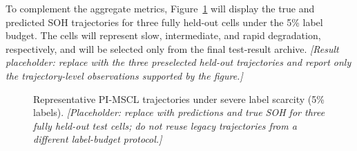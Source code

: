 To complement the aggregate metrics, Figure~\ref{fig:severe_scarcity_trajectories} will display the true and predicted SOH trajectories for three fully held-out cells under the 5\% label budget. The cells will represent slow, intermediate, and rapid degradation, respectively, and will be selected only from the final test-result archive. \textit{[Result placeholder: replace with the three preselected held-out trajectories and report only the trajectory-level observations supported by the figure.]}

\begin{figure}[t]
\centering
\begin{minipage}[t]{0.31\linewidth}
\centering
{}
\end{minipage}\hfill
\begin{minipage}[t]{0.31\linewidth}
\centering
{}
\end{minipage}\hfill
\begin{minipage}[t]{0.31\linewidth}
\centering
{}
\end{minipage}
\caption{Representative PI-MSCL trajectories under severe label scarcity (5\% labels). \textit{[Placeholder: replace with predictions and true SOH for three fully held-out test cells; do not reuse legacy trajectories from a different label-budget protocol.]}}
\label{fig:severe_scarcity_trajectories}
\end{figure}

